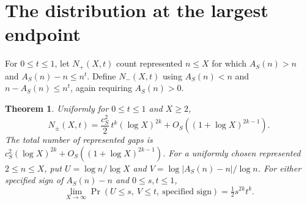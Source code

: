 \documentclass[11pt,letterpaper]{article}
\newtheorem{theorem}{Theorem}
\begin{document}
\section{The distribution at the largest endpoint}
For $0\le t\le1$, let $N_+(X,t)$ count represented $n\le X$ for which $A_S(n)>n$ and $A_S(n)-n\le n^t$. Define $N_-(X,t)$ using $A_S(n)<n$ and $n-A_S(n)\le n^t$, again requiring $A_S(n)>0$.
\begin{theorem}\label{th:law}
Uniformly for $0\le t\le1$ and $X\ge2$,
\[
 N_\pm(X,t)=\frac{c_S^2}{2}\,t^k(\log X)^{2k}
                +O_S((1+\log X)^{2k-1}).
\]
The total number of represented gaps is $c_S^2(\log X)^{2k}+O_S((1+\log X)^{2k-1})$.
For a uniformly chosen represented $2\le n\le X$, put
$U=\log n/\log X$ and $V=\log|A_S(n)-n|/\log n$.
For either specified sign of $A_S(n)-n$ and $0\le s,t\le1$,
\[
 \lim_{X\to\infty}\Pr(U\le s,\ V\le t,\ \text{specified sign})
       =\tfrac12 s^{2k}t^k .
\]
\end{theorem}
\end{document}
